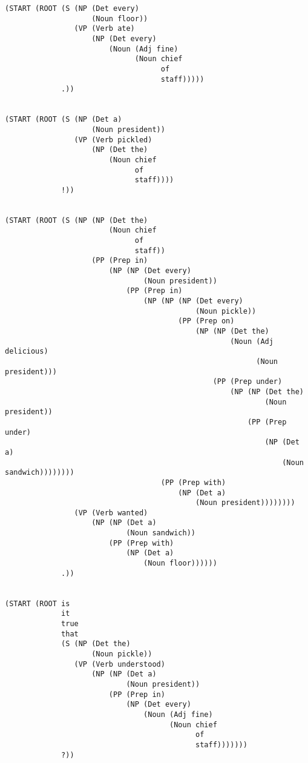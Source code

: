 \documentclass[10pt]{article}
\begin{document}
\begin{enumerate}
{\begin{verbatim}
(START (ROOT (S (NP (Det every)
                    (Noun floor))
                (VP (Verb ate)
                    (NP (Det every)
                        (Noun (Adj fine)
                              (Noun chief
                                    of
                                    staff)))))
             .))


(START (ROOT (S (NP (Det a)
                    (Noun president))
                (VP (Verb pickled)
                    (NP (Det the)
                        (Noun chief
                              of
                              staff))))
             !))


(START (ROOT (S (NP (NP (Det the)
                        (Noun chief
                              of
                              staff))
                    (PP (Prep in)
                        (NP (NP (Det every)
                                (Noun president))
                            (PP (Prep in)
                                (NP (NP (NP (Det every)
                                            (Noun pickle))
                                        (PP (Prep on)
                                            (NP (NP (Det the)
                                                    (Noun (Adj delicious)
                                                          (Noun president)))
                                                (PP (Prep under)
                                                    (NP (NP (Det the)
                                                            (Noun president))
                                                        (PP (Prep under)
                                                            (NP (Det a)
                                                                (Noun sandwich))))))))
                                    (PP (Prep with)
                                        (NP (Det a)
                                            (Noun president))))))))
                (VP (Verb wanted)
                    (NP (NP (Det a)
                            (Noun sandwich))
                        (PP (Prep with)
                            (NP (Det a)
                                (Noun floor))))))
             .))


(START (ROOT is
             it
             true
             that
             (S (NP (Det the)
                    (Noun pickle))
                (VP (Verb understood)
                    (NP (NP (Det a)
                            (Noun president))
                        (PP (Prep in)
                            (NP (Det every)
                                (Noun (Adj fine)
                                      (Noun chief
                                            of
                                            staff)))))))
             ?))



\end{verbatim}}
\end{enumerate}
\end{document}

